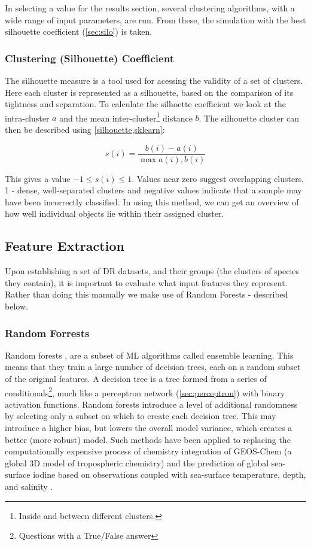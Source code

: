 In selecting a value for the results section, several clustering algorithms, with a wide range of input parameters, are run. From these, the simulation with the best silhouette coefficient (\autoref{sec:silo}) is taken.




\subsubsection{Clustering (Silhouette) Coefficient}\label{sec:silo}
The silhouette measure is a tool used for acessing the validity of a set of clusters. Here each cluster is represented as a silhouette, based on the comparison of its tightness and separation. To calculate the silhoette coefficient we look at the intra-cluster $a$ and the mean inter-cluster\footnote{Inside and between different clusters.} distance $b$. The silhouette cluster can then be described using \ref{silhouette,sklearn}:

\begin{equation}
s(i) = \frac{b(i)-a(i)}{\max{ a(i), b(i)}}
\end{equation}

This gives a value $-1 \le s(i) \le 1$. Values near zero suggest overlapping clusters, 1 - dense, well-separated clusters and negative values indicate that a sample may have been incorrectly classified. In using this method, we can get an overview of how well individual objects lie within their assigned cluster.




\subsection{Feature Extraction}\label{sec:drfeature}
Upon establishing a set of DR datasets, and their groups (the clusters of species they contain), it is important to evaluate what input features they represent. Rather than doing this manually we make use of Random Forests - described below.

\subsubsection{Random Forrests}
Random forests \citep{rfrr}, are a subset of ML algorithms called ensemble learning. This means that they train a large number of decision trees, each on a random subset of the original features. A decision tree is a tree formed from a series of conditionals\footnote{Questions with a True/False answer}, much like a perceptron network (\autoref{sec:perceptron}) with binary activation functions. Random forests introduce a level of additional randomness by selecting only a subset on which to create each decision tree. This may introduce a higher bias, but lowers the overall model variance, which creates a better (more robust) model. Such methods have been applied to replacing the computationally expensive process of chemistry integration of GEOS-Chem (a global 3D model of tropospheric chemistry) \citep{geosrf} and the prediction of global sea-surface iodine based on observations coupled with sea-surface temperature, depth, and salinity \citep{iodene}.

